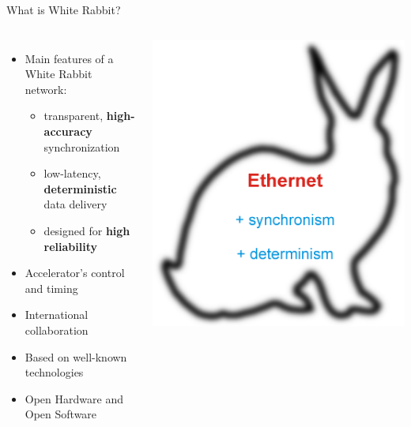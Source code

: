 \documentclass[compress,red]{beamer}
\begin{document}
\begin{frame}{What is White Rabbit?}

\begin{columns}[c]
	  \begin{itemize}
		\item Main features of a White Rabbit network:
		\begin{itemize}
		  \item transparent,  {\bf high-accuracy} synchronization
		  \item low-latency,  {\bf deterministic} data delivery
		  \item designed for  {\bf high reliability}
		\end{itemize}
		\item Accelerator's control and timing
		\item International collaboration
		\item Based on well-known technologies
		\item Open Hardware and Open Software

	  \end{itemize}
		\begin{center}
		\hspace{-0.5cm}
		\includegraphics[width=1.1\textwidth]{../../figures/misc/rabbit.pdf}

		\end{center}
	\end{columns}

\end{frame}
\end{document}
